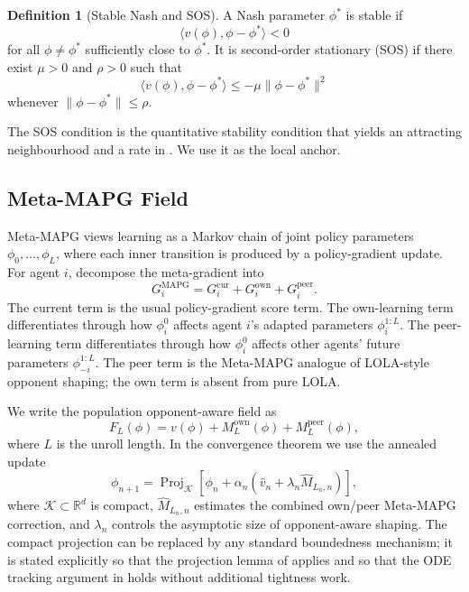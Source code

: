 \documentclass{article}
\theoremstyle{plain}
\theoremstyle{definition}
\newtheorem{definition}[theorem]{Definition}
\theoremstyle{remark}
\newcommand{\R}{\mathbb{R}}
\newcommand{\K}{\mathcal{K}}
\newcommand{\Proj}{\operatorname{Proj}}
\begin{document}
\begin{definition}[Stable Nash and SOS]\label{def:sos}
A Nash parameter $\phi^\ast$ is stable if
\[
\langle v(\phi),\phi-\phi^\ast\rangle <0
\]
for all $\phi\ne\phi^\ast$ sufficiently close to $\phi^\ast$. It is second-order stationary (SOS) if there exist $\mu>0$ and $\rho>0$ such that
\[
\langle v(\phi),\phi-\phi^\ast\rangle\le -\mu\|\phi-\phi^\ast\|^2
\]
whenever $\|\phi-\phi^\ast\|\le\rho$.
\end{definition}

The SOS condition is the quantitative stability condition that yields an attracting neighbourhood and a rate in \citet{giannou2022convergence}. We use it as the local anchor.

\subsection{Meta-MAPG Field}

Meta-MAPG views learning as a Markov chain of joint policy parameters $\phi_0,\ldots,\phi_L$, where each inner transition is produced by a policy-gradient update. For agent $i$, \citet{kim2021meta} decompose the meta-gradient into
\[
G_i^{\mathrm{MAPG}}
=G_i^{\mathrm{cur}}+G_i^{\mathrm{own}}+G_i^{\mathrm{peer}}.
\]
The current term is the usual policy-gradient score term. The own-learning term differentiates through how $\phi_i^0$ affects agent $i$'s adapted parameters $\phi_i^{1:L}$. The peer-learning term differentiates through how $\phi_i^0$ affects other agents' future parameters $\phi_{-i}^{1:L}$. The peer term is the Meta-MAPG analogue of LOLA-style opponent shaping; the own term is absent from pure LOLA.

We write the population opponent-aware field as
\[
F_L(\phi)=v(\phi)+M_L^{\mathrm{own}}(\phi)+M_L^{\mathrm{peer}}(\phi),
\]
where $L$ is the unroll length. In the convergence theorem we use the annealed update
\begin{equation}\label{eq:update}
\phi_{n+1}
=\Proj_{\K}\!\left[\phi_n+\alpha_n\left(\hat v_n+\lambda_n\hat M_{L_n,n}\right)\right],
\end{equation}
where $\K\subset\R^d$ is compact, $\hat M_{L_n,n}$ estimates the combined own/peer Meta-MAPG correction, and $\lambda_n$ controls the asymptotic size of opponent-aware shaping. The compact projection can be replaced by any standard boundedness mechanism; it is stated explicitly so that the projection lemma of \citet{kushner1978stochastic} applies and so that the ODE tracking argument in \citet{borkar2008stochastic} holds without additional tightness work.
\end{document}
